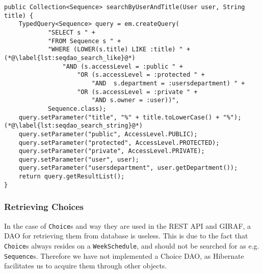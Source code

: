 \begin{lstlisting}[float, floatplacement=h, caption={The method in \texttt{SequenceDaoImpl} which allows for \texttt{Sequence}s to be searched for by title}, label={lst:seqdao_search}]
public Collection<Sequence> searchByUserAndTitle(User user, String title) {
    TypedQuery<Sequence> query = em.createQuery(
            "SELECT s " +
            "FROM Sequence s " +
            "WHERE (LOWER(s.title) LIKE :title) " +(*@\label{lst:seqdao_search_like}@*)
                "AND (s.accessLevel = :public " +
                    "OR (s.accessLevel = :protected " +
                        "AND  s.department = :usersdepartment) " +
                    "OR (s.accessLevel = :private " +
                        "AND s.owner = :user))",
            Sequence.class);
    query.setParameter("title", "%" + title.toLowerCase() + "%");(*@\label{lst:seqdao_search_string}@*)
    query.setParameter("public", AccessLevel.PUBLIC);
    query.setParameter("protected", AccessLevel.PROTECTED);
    query.setParameter("private", AccessLevel.PRIVATE);
    query.setParameter("user", user);
    query.setParameter("usersdepartment", user.getDepartment());
    return query.getResultList();
}
\end{lstlisting}

\subsubsection{Retrieving Choices}
In the case of \texttt{Choice}s and way they are used in the REST API and GIRAF, a DAO for retrieving them from database is useless.
This is due to the fact that \texttt{Choice}s always resides on a \texttt{WeekSchedule}, and should not be searched for as e.g. \texttt{Sequence}s.
Therefore we have not implemented a Choice DAO, as Hibernate facilitates us to acquire them through other objects.



